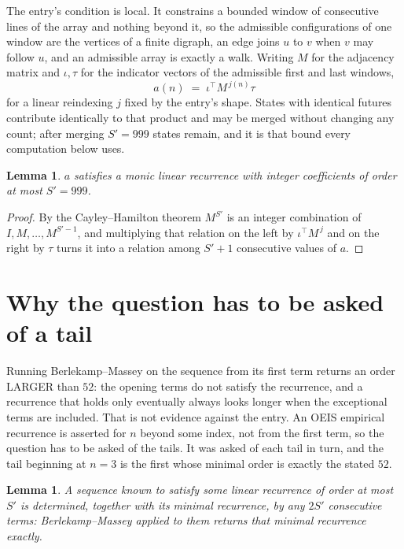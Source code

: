 \documentclass[11pt,a4paper]{article}
\theoremstyle{plain}
\newtheorem{lemma}[theorem]{Lemma}
\theoremstyle{definition}
\begin{document}
The entry's condition is local. It constrains a bounded window of consecutive lines of the
array and nothing beyond it, so the admissible configurations of one window are the vertices of
a finite digraph, an edge joins $u$ to $v$ when $v$ may follow $u$, and an admissible array is
exactly a walk. Writing $M$ for the adjacency matrix and $\iota,\tau$ for the indicator vectors
of the admissible first and last windows,
\[
a(n)\;=\;\iota^{\!\top}M^{\,j(n)}\tau
\]
for a linear reindexing $j$ fixed by the entry's shape. States with identical futures
contribute identically to that product and may be merged without changing any count; after
merging $S'=999$ states remain, and it is that bound every computation below uses.

\begin{lemma}\label{lem:cf}
$a$ satisfies a monic linear recurrence with integer coefficients of order at most $S'=999$.
\end{lemma}

\begin{proof}
By the Cayley--Hamilton theorem $M^{S'}$ is an integer combination of $I,M,\dots,M^{S'-1}$,
and multiplying that relation on the left by $\iota^{\!\top}M^{\,j}$ and on the right by
$\tau$ turns it into a relation among $S'+1$ consecutive values of $a$.
\end{proof}

\section{Why the question has to be asked of a tail}

Running Berlekamp--Massey on the sequence from its first term returns an order LARGER than $52$: the opening terms do not satisfy the recurrence, and a recurrence that holds only eventually always looks longer when the exceptional terms are included. That is not evidence against the entry. An OEIS empirical recurrence is asserted for $n$ beyond some index, not from the first term, so the question has to be asked of the tails. It was asked of each tail in turn, and the tail beginning at $n=3$ is the first whose minimal order is exactly the stated $52$.

\begin{lemma}\label{lem:bm}
A sequence known to satisfy some linear recurrence of order at most $S'$ is determined,
together with its minimal recurrence, by any $2S'$ consecutive terms: Berlekamp--Massey applied
to them returns that minimal recurrence exactly.
\end{lemma}
\end{document}

